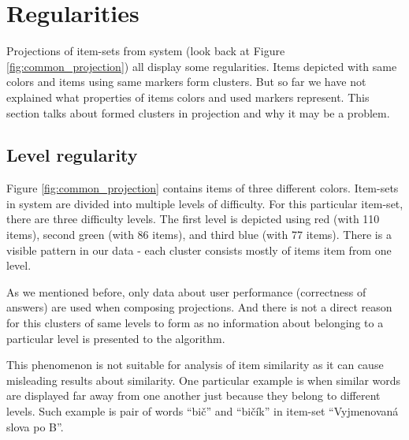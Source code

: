\documentclass[
  digital, %
  table,   %
  nolof,     %
  nolot,     %
  nocover,
  color
]{fithesis3}
\begin{document}

\section{Regularities}\label{regularities}


Projections of item-sets from system \umimeCesky{} (look back at Figure \ref{fig:common_projection}) all display some regularities. Items depicted with same colors and items using same markers form clusters. But so far we have not explained what properties of items colors and used markers represent. This section talks about formed clusters in projection and why it may be a problem.


\subsection{Level regularity}\label{regularities-level-regularity}


Figure \ref{fig:common_projection} contains items of three different colors. Item-sets in system \umimeCesky{} are divided into multiple levels of difficulty. For this particular item-set, there are three difficulty levels. The first level is depicted using red (with 110 items), second green (with 86 items), and third blue (with 77 items). There is a  visible pattern in our data - each cluster consists mostly of items item from one level.

As we mentioned before, only data about user performance (correctness of answers) are used when composing projections. And there is not a direct reason for this clusters of same levels to form as no information about belonging to a particular level is presented to the algorithm.


This phenomenon is not suitable for analysis of item similarity as it can cause misleading results about similarity. One particular example is when similar words are displayed far away from one another just because they belong to different levels. Such example is pair of words ``bič'' and ``bičík'' in item-set ``Vyjmenovaná slova po B''.

\end{document}
